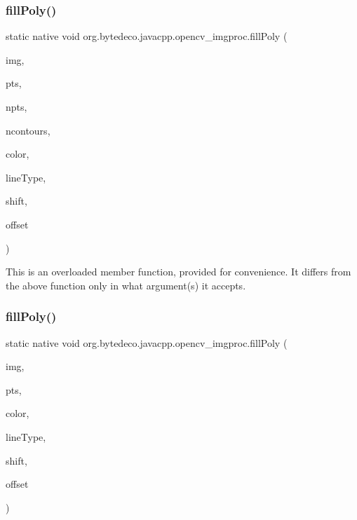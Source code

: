 \subsubsection{\texorpdfstring{fill\+Poly()}{fillPoly()}\hspace{0.1cm}{\footnotesize\ttfamily [1/2]}}
{\footnotesize\ttfamily static native void org.\+bytedeco.\+javacpp.\+opencv\+\_\+imgproc.\+fill\+Poly (\begin{DoxyParamCaption}\item[{@By\+Ref Mat}]{img,  }\item[{@Cast(\char`\"{}const cv\+::\+Point$\ast$$\ast$\char`\"{}) Pointer\+Pointer}]{pts,  }\item[{@Const Int\+Pointer}]{npts,  }\item[{int}]{ncontours,  }\item[{@Const @By\+Ref Scalar}]{color,  }\item[{int}]{line\+Type,  }\item[{int}]{shift,  }\item[{@By\+Val(null\+Value=\char`\"{}cv\+::\+Point()\char`\"{}) Point}]{offset }\end{DoxyParamCaption})\hspace{0.3cm}{\ttfamily [static]}}

This is an overloaded member function, provided for convenience. It differs from the above function only in what argument(s) it accepts. \mbox{\label{group__imgproc__draw_gaf4d0bf95bfbf1d3f0c4742d7486b3982}} 
\subsubsection{\texorpdfstring{fill\+Poly()}{fillPoly()}\hspace{0.1cm}{\footnotesize\ttfamily [2/2]}}
{\footnotesize\ttfamily static native void org.\+bytedeco.\+javacpp.\+opencv\+\_\+imgproc.\+fill\+Poly (\begin{DoxyParamCaption}\item[{@By\+Val Mat}]{img,  }\item[{@By\+Val Mat\+Vector}]{pts,  }\item[{@Const @By\+Ref Scalar}]{color,  }\item[{int}]{line\+Type,  }\item[{int}]{shift,  }\item[{@By\+Val(null\+Value=\char`\"{}cv\+::\+Point()\char`\"{}) Point}]{offset }\end{DoxyParamCaption})\hspace{0.3cm}{\ttfamily [static]}}




